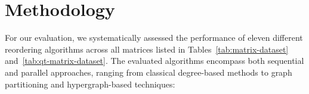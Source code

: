 \begin{table}[h]
\centering
\caption{Quantum Transport matrix dataset used for evaluation}
\label{tab:qt-matrix-dataset}
\end{table}

\section{Methodology}

For our evaluation, we systematically assessed the performance of eleven different reordering algorithms across all matrices listed in Tables~\ref{tab:matrix-dataset} and~\ref{tab:qt-matrix-dataset}. The evaluated algorithms encompass both sequential and parallel approaches, ranging from classical degree-based methods to graph partitioning and hypergraph-based techniques:

